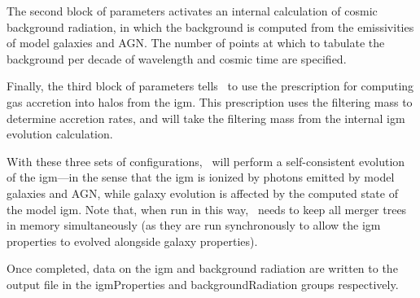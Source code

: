 The second block of parameters activates an internal calculation of cosmic background radiation, in which the background is computed from the emissivities of model galaxies and AGN. The number of points at which to tabulate the background per decade of wavelength and cosmic time are specified.

Finally, the third block of parameters tells \glc\ to use the \cite{naoz_formation_2007} prescription for computing gas accretion into halos from the \gls{igm}. This prescription uses the filtering mass to determine accretion rates, and will take the filtering mass from the internal \gls{igm} evolution calculation.

With these three sets of configurations, \glc\ will perform a self-consistent evolution of the \gls{igm}---in the sense that the \gls{igm} is ionized by photons emitted by model galaxies and AGN, while galaxy evolution is affected by the computed state of the model \gls{igm}. Note that, when run in this way, \glc\ needs to keep all merger trees in memory simultaneously (as they are run synchronously to allow the \gls{igm} properties to evolved alongside galaxy properties).

Once completed, data on the \gls{igm} and background radiation are written to the output file in the {\normalfont \ttfamily igmProperties} and {\normalfont \ttfamily backgroundRadiation} groups respectively.

